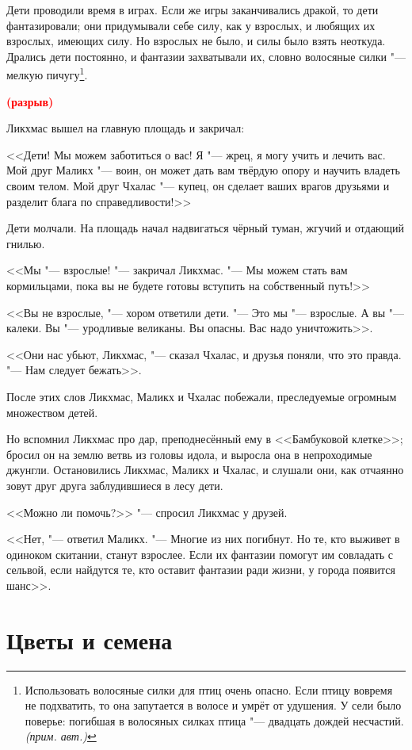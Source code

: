 \documentclass[a4paper,10pt,fleqn]{book}
\newcommand{\spacing}{\textcolor{red}{\textbf{(разрыв)}}}
\newcommand{\authornote}{\textit{(прим. авт.)}}
\begin{document}
Дети проводили время в играх.
Если же игры заканчивались дракой, то дети фантазировали;
они придумывали себе силу, как у взрослых, и любящих их взрослых, имеющих силу.
Но взрослых не было, и силы было взять неоткуда.
Дрались дети постоянно, и фантазии захватывали их, словно волосяные силки "--- мелкую пичугу\footnote
{Использовать волосяные силки для птиц очень опасно.
Если птицу вовремя не подхватить, то она запутается в волосе и умрёт от удушения.
У сели было поверье: погибшая в волосяных силках птица "--- двадцать дождей несчастий. \authornote}.

\spacing

Ликхмас вышел на главную площадь и закричал:

<<Дети!
Мы можем заботиться о вас!
Я "--- жрец, я могу учить и лечить вас.
Мой друг Маликх "--- воин, он может дать вам твёрдую опору и научить владеть своим телом.
Мой друг Чхалас "--- купец, он сделает ваших врагов друзьями и разделит блага по справедливости!>>

Дети молчали.
На площадь начал надвигаться чёрный туман, жгучий и отдающий гнилью.

<<Мы "--- взрослые! "--- закричал Ликхмас.
"--- Мы можем стать вам кормильцами, пока вы не будете готовы вступить на собственный путь!>>

<<Вы не взрослые, "--- хором ответили дети.
"--- Это мы "--- взрослые.
А вы "--- калеки.
Вы "--- уродливые великаны.
Вы опасны.
Вас надо уничтожить>>.

<<Они нас убьют, Ликхмас, "--- сказал Чхалас, и друзья поняли, что это правда.
"--- Нам следует бежать>>.

После этих слов Ликхмас, Маликх и Чхалас побежали, преследуемые огромным множеством детей.

Но вспомнил Ликхмас про дар, преподнесённый ему в <<Бамбуковой клетке>>;
бросил он на землю ветвь из головы идола, и выросла она в непроходимые джунгли.
Остановились Ликхмас, Маликх и Чхалас, и слушали они, как отчаянно зовут друг друга заблудившиеся в лесу дети.

<<Можно ли помочь?>> "--- спросил Ликхмас у друзей.

<<Нет, "--- ответил Маликх.
"--- Многие из них погибнут.
Но те, кто выживет в одиноком скитании, станут взрослее.
Если их фантазии помогут им совладать с сельвой, если найдутся те, кто оставит фантазии ради жизни, у города появится шанс>>.

\section{Цветы и семена}
\end{document}
